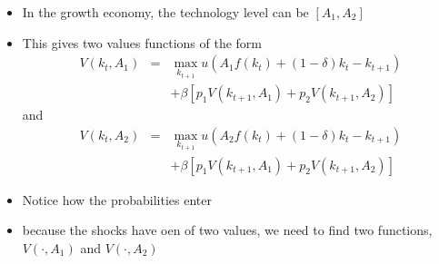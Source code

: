 \documentclass[notes=show]{beamer}
\begin{document}
\begin{frame}%


\begin{itemize}
\item In the growth economy, the technology level can be $\left[ A_{1},A_{2}%
\right] $

\item This gives two values functions of the form%
\begin{eqnarray*}
V(k_{t},A_{1}) &=&\max_{k_{t+1}}u(A_{1}f(k_{t})+(1-\delta )k_{t}-k_{t+1}) \\
&&+\beta \left[ p_{1}V\left( k_{t+1},A_{1}\right) +p_{2}V\left(
k_{t+1},A_{2}\right) \right]
\end{eqnarray*}%
and%
\begin{eqnarray*}
V(k_{t},A_{2}) &=&\max_{k_{t+1}}u(A_{2}f(k_{t})+(1-\delta )k_{t}-k_{t+1}) \\
&&+\beta \left[ p_{1}V\left( k_{t+1},A_{1}\right) +p_{2}V\left(
k_{t+1},A_{2}\right) \right]
\end{eqnarray*}

\item Notice how the probabilities enter

\item because the shocks have oen of two values, we need to find two
functions, $V(\cdot ,A_{1})$ and $V(\cdot ,A_{2})$
\end{itemize}

\end{frame}%
\end{document}
